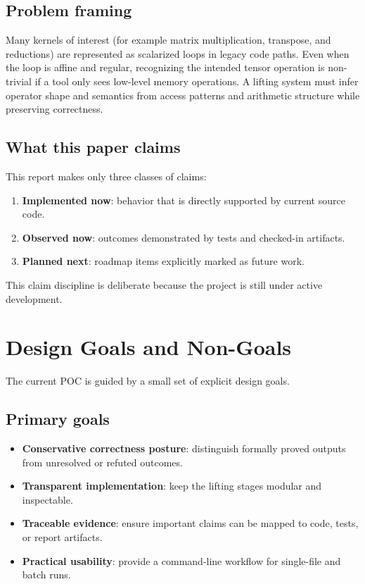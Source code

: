 \documentclass[conference]{IEEEtran}
\begin{document}
\subsection{Problem framing}
Many kernels of interest (for example matrix multiplication, transpose, and reductions) are represented as scalarized loops in legacy code paths. Even when the loop is affine and regular, recognizing the intended tensor operation is non-trivial if a tool only sees low-level memory operations. A lifting system must infer operator shape and semantics from access patterns and arithmetic structure while preserving correctness.

\subsection{What this paper claims}
This report makes only three classes of claims:
\begin{enumerate}
\item \textbf{Implemented now}: behavior that is directly supported by current source code.
\item \textbf{Observed now}: outcomes demonstrated by tests and checked-in artifacts.
\item \textbf{Planned next}: roadmap items explicitly marked as future work.
\end{enumerate}
This claim discipline is deliberate because the project is still under active development.

\section{Design Goals and Non-Goals}
The current POC is guided by a small set of explicit design goals.

\subsection{Primary goals}
\begin{itemize}
\item \textbf{Conservative correctness posture}: distinguish formally proved outputs from unresolved or refuted outcomes.
\item \textbf{Transparent implementation}: keep the lifting stages modular and inspectable.
\item \textbf{Traceable evidence}: ensure important claims can be mapped to code, tests, or report artifacts.
\item \textbf{Practical usability}: provide a command-line workflow for single-file and batch runs.
\end{itemize}
\end{document}
